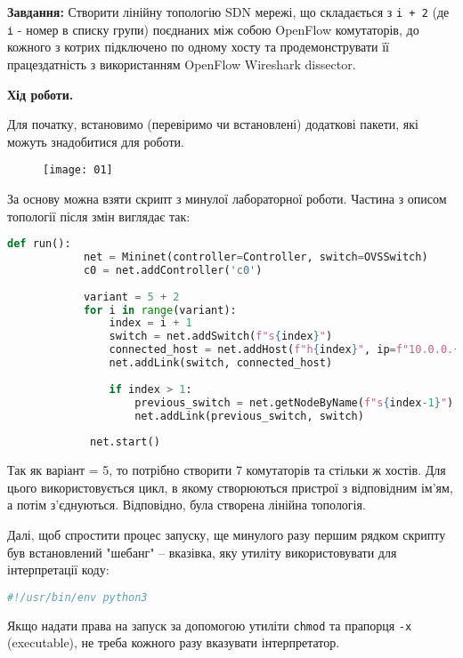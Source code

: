 \documentclass[14pt, a4paper]{extreport}
\begin{document}
	\textbf{Завдання:}
	Створити лінійну топологію SDN мережі, що складається з \texttt{i + 2} (де \texttt{і} - номер в списку групи) поєднаних між собою OpenFlow комутаторів, до кожного з котрих підключено по одному хосту та продемонструвати її працездатність з використанням OpenFlow Wireshark dissector.
	
	\begin{center}
		\textbf{Хід роботи.}
	\end{center}
	
	Для початку, встановимо (перевіримо чи встановлені) додаткові пакети, які можуть знадобитися для роботи.
	
	\begin{figure}[H]
		\centering
		\texttt{[image: 01]} 
	\end{figure}
	
	За основу можна взяти скрипт з минулої лабораторної роботи. Частина з описом топології після змін виглядає так:
	
	\begin{lstlisting}[language=Python]
		def run():
			net = Mininet(controller=Controller, switch=OVSSwitch)
			c0 = net.addController('c0')
		
			variant = 5 + 2
			for i in range(variant):
				index = i + 1
				switch = net.addSwitch(f"s{index}")
				connected_host = net.addHost(f"h{index}", ip=f"10.0.0.{index}/24")
				net.addLink(switch, connected_host)
		
				if index > 1:
					previous_switch = net.getNodeByName(f"s{index-1}")
					net.addLink(previous_switch, switch)
		
			 net.start()
		\end{lstlisting}
	
	Так як варіант = 5, то потрібно створити 7 комутаторів та стільки ж хостів. Для цього використовується цикл, в якому створюються пристрої з відповідним ім'ям, а потім з'єднуються. Відповідно, була створена лінійна топологія.
	
	Далі, щоб спростити процес запуску, ще минулого разу першим рядком скрипту був встановлений "шебанг" -- вказівка, яку утиліту використовувати для інтерпретації коду:
	
	\begin{lstlisting}[language=Bash]
		#!/usr/bin/env python3\end{lstlisting}
	
	Якщо надати права на запуск за допомогою утиліти \texttt{chmod} та прапорця \texttt{-x} (executable), не треба кожного разу вказувати інтерпретатор. 
	
\end{document}
